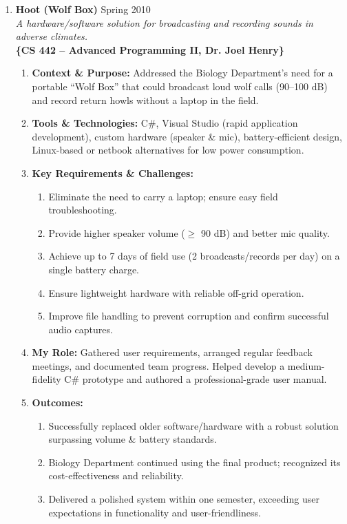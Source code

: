 \documentclass[oneside]{article}%
\begin{document}
\begin{enumerate}[]
\begin{enumerate}[]
			\normalsize
			\item \textbf{Hoot (Wolf Box)} \hfill Spring 2010\\
			\small
			\textit{A hardware/software solution for broadcasting and recording sounds in adverse climates.}\\
			\textbf{\{CS 442 -- Advanced Programming II, Dr. Joel Henry\}}
				\begin{enumerate}[-]
				
					\item \textbf{Context \& Purpose:} Addressed the Biology Department’s need for a portable “Wolf Box” that could broadcast loud wolf calls (90--100 dB) and record return howls without a laptop in the field.
					\item \textbf{Tools \& Technologies:} C\#, Visual Studio (rapid application development), custom hardware (speaker \& mic), battery-efficient design, Linux-based or netbook alternatives for low power consumption.
					\item \textbf{Key Requirements \& Challenges:}
						\begin{enumerate}[--]
							\item Eliminate the need to carry a laptop; ensure easy field troubleshooting.
							\item Provide higher speaker volume ($\geq$ 90 dB) and better mic quality.
							\item Achieve up to 7 days of field use (2 broadcasts/records per day) on a single battery charge.
							\item Ensure lightweight hardware with reliable off-grid operation.
							\item Improve file handling to prevent corruption and confirm successful audio captures.
						\end{enumerate}
					\item \textbf{My Role:} Gathered user requirements, arranged regular feedback meetings, and documented team progress. Helped develop a medium-fidelity C\# prototype and authored a professional-grade user manual.
					\item \textbf{Outcomes:}
						\begin{enumerate}[--]
							\item Successfully replaced older software/hardware with a robust solution surpassing volume \& battery standards.
							\item Biology Department continued using the final product; recognized its cost-effectiveness and reliability.
							\item Delivered a polished system within one semester, exceeding user expectations in functionality and user-friendliness.

\end{enumerate}
\end{enumerate}
\end{enumerate}
\end{enumerate}
\end{document}
